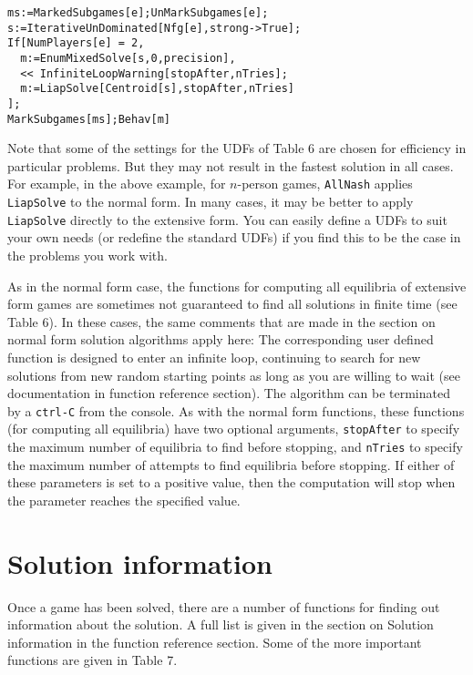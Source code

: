 \begin{verbatim}
ms:=MarkedSubgames[e];UnMarkSubgames[e];
s:=IterativeUnDominated[Nfg[e],strong->True];
If[NumPlayers[e] = 2, 
  m:=EnumMixedSolve[s,0,precision],
  << InfiniteLoopWarning[stopAfter,nTries];
  m:=LiapSolve[Centroid[s],stopAfter,nTries]
];
MarkSubgames[ms];Behav[m]
\end{verbatim} 

Note that some of the settings for the UDFs of Table 6 are chosen for
efficiency in particular problems.  But they may not result in the
fastest solution in all cases.  For example, in the above example, for
$n$-person games, \verb+AllNash+ applies \verb+LiapSolve+ to the normal form.
In many cases, it may be better to apply \verb+LiapSolve+ directly to
the extensive form.  You can easily define a UDFs to suit your own
needs (or redefine the standard UDFs) if you find this to be the case
in the problems you work with.  

As in the normal form case, the functions for computing all equilibria
of extensive form games are sometimes not guaranteed to find all
solutions in finite time (see Table 6).  In these cases, the same
comments that are made in the section on normal form solution
algorithms apply here: The corresponding user defined function is
designed to enter an infinite loop, continuing to search for new
solutions from new random starting points as long as you are willing
to wait (see documentation in function reference section).  The
algorithm can be terminated by a \verb+ctrl-C+ from the console.  As
with the normal form functions, these functions (for computing all
equilibria) have two optional arguments, \verb+stopAfter+ to specify
the maximum number of equilibria to find before stopping, and
\verb+nTries+ to specify the maximum number of attempts to find
equilibria before stopping. If either of these parameters is set to a
positive value, then the computation will stop when the parameter
reaches the specified value.

\section{Solution information}

Once a game has been solved, there are a number of functions for
finding out information about the solution.  A full list is given in
the section on Solution information in the function reference section.
Some of the more important functions are given in Table 7. 

